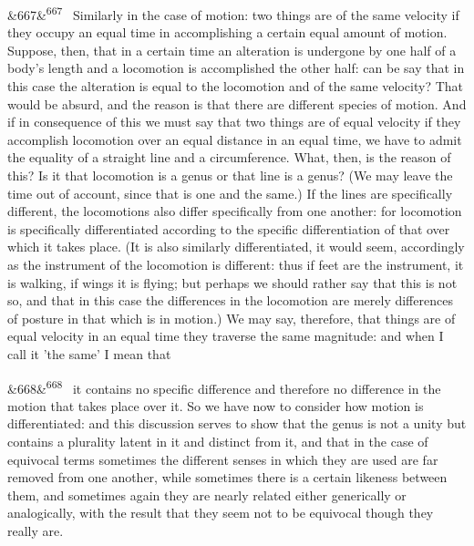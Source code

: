 \documentclass[12pt]{article}
\newcommand{\para}[1][]{\par\noindent\ifx&#1&\else\textsuperscript{\footnotesize #1}~\fi}
\begin{document}
\para[667] Similarly in the case of motion: two things are of the same velocity if they occupy an equal time in accomplishing a certain equal amount of motion. Suppose, then, that in a certain time an alteration is undergone by one half of a body's length and a locomotion is accomplished the other half: can be say that in this case the alteration is equal to the locomotion and of the same velocity? That would be absurd, and the reason is that there are different species of motion. And if in consequence of this we must say that two things are of equal velocity if they accomplish locomotion over an equal distance in an equal time, we have to admit the equality of a straight line and a circumference. What, then, is the reason of this? Is it that locomotion is a genus or that line is a genus? (We may leave the time out of account, since that is one and the same.) If the lines are specifically different, the locomotions also differ specifically from one another: for locomotion is specifically differentiated according to the specific differentiation of that over which it takes place. (It is also similarly differentiated, it would seem, accordingly as the instrument of the locomotion is different: thus if feet are the instrument, it is walking, if wings it is flying; but perhaps we should rather say that this is not so, and that in this case the differences in the locomotion are merely differences of posture in that which is in motion.) We may say, therefore, that things are of equal velocity in an equal time they traverse the same magnitude: and when I call it 'the same’ I mean that

\para[668] it contains no specific difference and therefore no difference in the motion that takes place over it. So we have now to consider how motion is differentiated: and this discussion serves to show that the genus is not a unity but contains a plurality latent in it and distinct from it, and that in the case of equivocal terms sometimes the different senses in which they are used are far removed from one another, while sometimes there is a certain likeness between them, and sometimes again they are nearly related either generically or analogically, with the result that they seem not to be equivocal though they really are.
\end{document}
